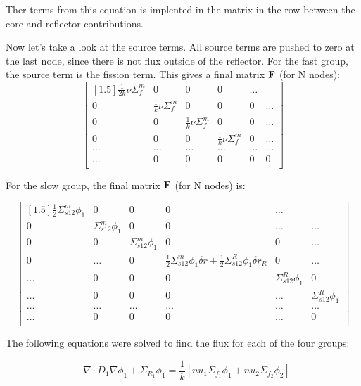 \documentclass[../main.tex]{subfiles}
\begin{document}
Ther terms from this equation is implented in the matrix in the row between the core and reflector contributions.

Now let's take a look at the source terms.  All source terms are pushed to zero at the last node, since there is not flux outside of the reflector.  For the fast group, the source term  is the fission term.  This gives a final matrix $\mathbf{F}$ (for N nodes):
	\[
	\begin{bmatrix}[1.5]
		\frac{1}{2k} \nu \Sigma^m_f  & 0 & 0 & 0 & \dots\\
		0 & \frac{1}{k} \nu \Sigma^m_f  & 0 & 0 & 0 & \dots \\
		0 & 0 & \frac{1}{k} \nu \Sigma^m_f  & 0 & 0 & \dots\\
		0 & 0 & 0 & \frac{1}{k} \nu \Sigma^m_f  & 0 & \dots \\
		\dots & \dots & \dots & \dots & \dots & \dots \\
		\dots & 0 & 0 & 0 & 0 & 0 \\
	\end{bmatrix}
	\]
	
For the slow group, the final matrix $\mathbf{F}$ (for N nodes) is:

\[
	\begin{bmatrix}[1.5]
		\frac{1}{2} \Sigma^m_{s12} \phi_1  & 0 & 0 & 0 & \dots\\
		0 & \Sigma^m_{s12} \phi_1 & 0 & 0 & \dots & \dots \\
		0 & 0 & \Sigma^m_{s12} \phi_1 & 0 & 0 & \dots\\
		0 & \dots & 0 & \frac{1}{2} \Sigma^m_{s12} \phi_1 \delta r + \frac{1}{2} \Sigma^R_{s12} \phi_1 \delta r_R  & 0 & \dots \\
		\dots & 0 & 0 & 0 & \Sigma^R_{s12} \phi_1 & 0 \\
		\dots & 0 & 0 & 0 & \dots & \Sigma^R_{s12} \phi_1 \\
		\dots & \dots & \dots & \dots & \dots & \dots \\
		\dots & 0 & 0 & 0 & \dots & 0 \\
	\end{bmatrix}
	\]

The following equations were solved to find the flux for each of the four groups:

\begin{equation*}
		- \nabla \cdot D_{1} \nabla \phi_{1}+ \Sigma_{R_1} \phi_1 = \frac{1}{k} [nu_1 \Sigma_{f_1} \phi_{1} + nu_2 \Sigma_{f_2} \phi_{2}] 
	\end{equation*}
	
\end{document}
